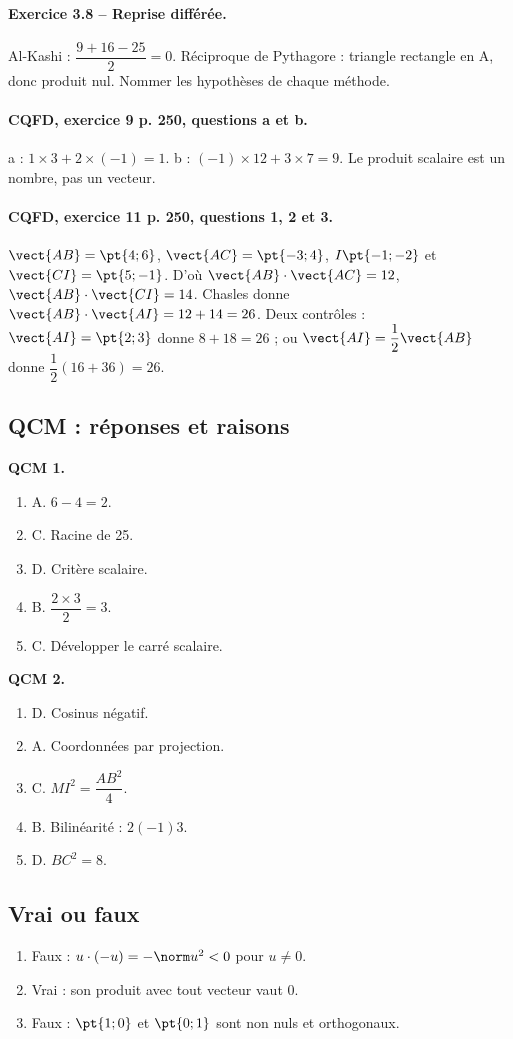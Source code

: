 \paragraph{Exercice 3.8 -- Reprise différée.} Al-Kashi : $\dfrac{9+16-25}{2}=0$. Réciproque de Pythagore : triangle rectangle en A, donc produit nul. Nommer les hypothèses de chaque méthode.
\paragraph{CQFD, exercice 9 p. 250, questions a et b.} a : $1\times3+2\times(-1)=1$. b : $(-1)\times12+3\times7=9$. Le produit scalaire est un nombre, pas un vecteur.
\paragraph{CQFD, exercice 11 p. 250, questions 1, 2 et 3.} $\vect{AB}=\pt{4;6}$, $\vect{AC}=\pt{-3;4}$, $I\pt{-1;-2}$ et $\vect{CI}=\pt{5;-1}$. D’où $\vect{AB}\cdot\vect{AC}=12$, $\vect{AB}\cdot\vect{CI}=14$. Chasles donne $\vect{AB}\cdot\vect{AI}=12+14=26$. Deux contrôles : $\vect{AI}=\pt{2;3}$ donne $8+18=26$ ; ou $\vect{AI}=\dfrac12\vect{AB}$ donne $\dfrac12(16+36)=26$.
\subsection*{QCM : réponses et raisons}
\textbf{QCM 1.}
\begin{enumerate}
\item A. $6-4=2$.
\item C. Racine de 25.
\item D. Critère scalaire.
\item B. $\dfrac{2\times 3}{2}=3$.
\item C. Développer le carré scalaire.
\end{enumerate}
\textbf{QCM 2.}
\begin{enumerate}
\item D. Cosinus négatif.
\item A. Coordonnées par projection.
\item C. $MI^2=\dfrac{AB^2}{4}$.
\item B. Bilinéarité : $2(-1)3$.
\item D. $BC^2=8$.
\end{enumerate}
\subsection*{Vrai ou faux}
\begin{enumerate}
\item Faux : $u\cdot(-u)=-\norm u^2<0$ pour $u\ne0$.
\item Vrai : son produit avec tout vecteur vaut 0.
\item Faux : $\pt{1;0}$ et $\pt{0;1}$ sont non nuls et orthogonaux.
\end{enumerate}
